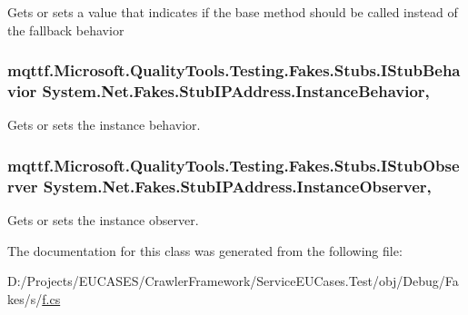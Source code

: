 Gets or sets a value that indicates if the base method should be called instead of the fallback behavior

\hypertarget{class_system_1_1_net_1_1_fakes_1_1_stub_i_p_address_aad50414a9b6947a26aeb0d29d198a3b9}{
\subsubsection[{Instance\-Behavior}]{\setlength{\rightskip}{0pt plus 5cm}mqttf.\-Microsoft.\-Quality\-Tools.\-Testing.\-Fakes.\-Stubs.\-I\-Stub\-Behavior System.\-Net.\-Fakes.\-Stub\-I\-P\-Address.\-Instance\-Behavior\hspace{0.3cm}{\ttfamily [get]}, {\ttfamily [set]}}}\label{class_system_1_1_net_1_1_fakes_1_1_stub_i_p_address_aad50414a9b6947a26aeb0d29d198a3b9}


Gets or sets the instance behavior.

\hypertarget{class_system_1_1_net_1_1_fakes_1_1_stub_i_p_address_a81bfbfb779635417dd72de3080b6ab83}{
\subsubsection[{Instance\-Observer}]{\setlength{\rightskip}{0pt plus 5cm}mqttf.\-Microsoft.\-Quality\-Tools.\-Testing.\-Fakes.\-Stubs.\-I\-Stub\-Observer System.\-Net.\-Fakes.\-Stub\-I\-P\-Address.\-Instance\-Observer\hspace{0.3cm}{\ttfamily [get]}, {\ttfamily [set]}}}\label{class_system_1_1_net_1_1_fakes_1_1_stub_i_p_address_a81bfbfb779635417dd72de3080b6ab83}


Gets or sets the instance observer.



The documentation for this class was generated from the following file\-:\begin{DoxyCompactItemize}
\item 
D\-:/\-Projects/\-E\-U\-C\-A\-S\-E\-S/\-Crawler\-Framework/\-Service\-E\-U\-Cases.\-Test/obj/\-Debug/\-Fakes/s/\hyperlink{s_2f_8cs}{f.\-cs}\end{DoxyCompactItemize}
